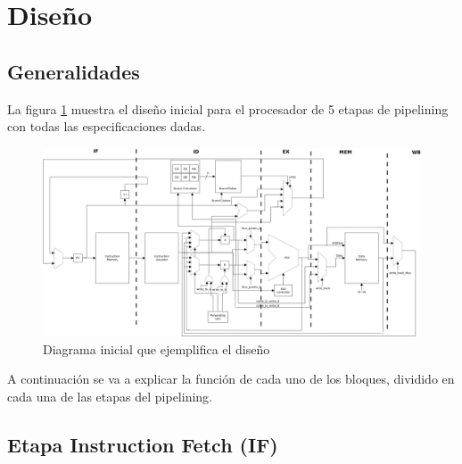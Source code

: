 \newpage
\section{Dise\~ no}

\subsection{Generalidades}


La figura \ref{fig:DiagramaInicial} muestra el diseño inicial para el procesador de 5 etapas de pipelining con todas las especificaciones dadas.

\begin{figure}[H]
	\centering
		\includegraphics[width=\textwidth]{./imagenes/DiagramaInicial}
	\caption{Diagrama inicial que ejemplifica el diseño}
	\label{fig:DiagramaInicial}
\end{figure}

A continuación se va a explicar la función de cada uno de los bloques, dividido en cada una de las etapas del pipelining.

\subsection{Etapa Instruction Fetch (IF)}

